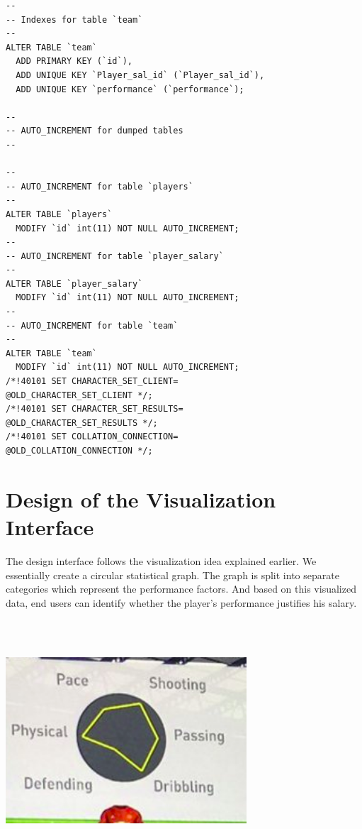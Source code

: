 \documentclass[journal]{vgtc}                %
\begin{document}
\begin{lstlisting}
--
-- Indexes for table `team`
--
ALTER TABLE `team`
  ADD PRIMARY KEY (`id`),
  ADD UNIQUE KEY `Player_sal_id` (`Player_sal_id`),
  ADD UNIQUE KEY `performance` (`performance`);

--
-- AUTO_INCREMENT for dumped tables
--

--
-- AUTO_INCREMENT for table `players`
--
ALTER TABLE `players`
  MODIFY `id` int(11) NOT NULL AUTO_INCREMENT;
--
-- AUTO_INCREMENT for table `player_salary`
--
ALTER TABLE `player_salary`
  MODIFY `id` int(11) NOT NULL AUTO_INCREMENT;
--
-- AUTO_INCREMENT for table `team`
--
ALTER TABLE `team`
  MODIFY `id` int(11) NOT NULL AUTO_INCREMENT;
/*!40101 SET CHARACTER_SET_CLIENT=
@OLD_CHARACTER_SET_CLIENT */;
/*!40101 SET CHARACTER_SET_RESULTS=
@OLD_CHARACTER_SET_RESULTS */;
/*!40101 SET COLLATION_CONNECTION=
@OLD_COLLATION_CONNECTION */;

\end{lstlisting}

\section{Design of the Visualization Interface}
The design interface follows the visualization idea explained earlier. We essentially create a circular statistical graph. The graph is split into separate categories which represent the performance factors. And based on this visualized data, end users can identify whether the player’s performance justifies his salary.

\includegraphics[width=9cm, height=9cm]{stats}



\end{document}
